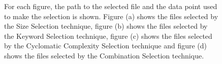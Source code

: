 \begin{figure}[H]
  \centering
  \caption[Project C Selections and Metrics]{For each figure, the path to the selected file and the data point used to make the selection is shown. Figure (a) shows the files selected by the Size Selection technique, figure (b) shows the files selected by the Keyword Selection technique, figure (c) shows the files selected by the Cyclomatic Complexity Selection technique and figure (d) shows the files selected by the Combination Selection technique.}
  \hfill
  \hfill
  \hfill
  

\end{figure}

